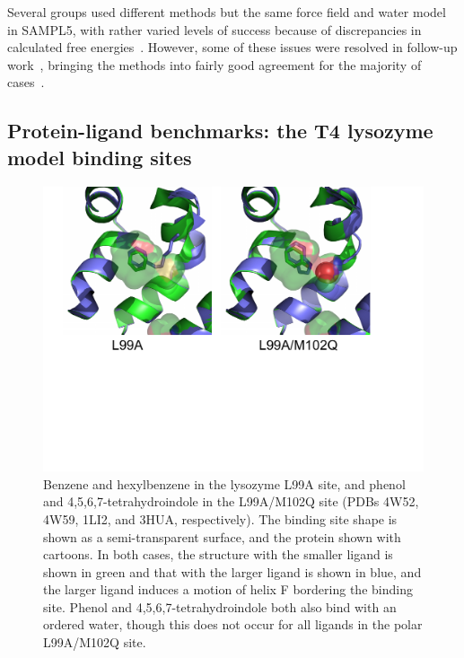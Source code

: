 \documentclass[aps,pre,twocolumn,nofootinbib,superscriptaddress,10pt, final,tightenlines]{revtex4-1}
\begin{document}

Several groups used different methods but the same force field and water model in SAMPL5, with rather varied levels of success because of discrepancies in calculated free energies~\cite{yin_overview_2016, bosisio_blinded_2016, bhakat_resolving_2016}. 
However, some of these issues were resolved in follow-up work~\cite{bhakat_resolving_2016}, bringing the methods into fairly good agreement for the majority of cases~\cite{yin_sampl5_2016, bosisio_blinded_2016}.

\subsection{Protein-ligand benchmarks: the T4 lysozyme model binding sites}

\begin{figure}
\includegraphics[width=\textwidth]{figures/lysozyme.pdf}
\caption{\label{fig:lysozyme} Benzene and hexylbenzene in the lysozyme L99A site, and phenol and 4,5,6,7-tetrahydroindole in the L99A/M102Q site (PDBs 4W52, 4W59, 1LI2, and 3HUA, respectively). The binding site shape is shown as a semi-transparent surface, and the protein shown with cartoons. In both cases, the structure with the smaller ligand is shown in green and that with the larger ligand is shown in blue, and the larger ligand induces a motion of helix F bordering the binding site. Phenol and 4,5,6,7-tetrahydroindole both also bind with an ordered water, though this does not occur for all ligands in the polar L99A/M102Q site.}
\end{figure}
\end{document}
